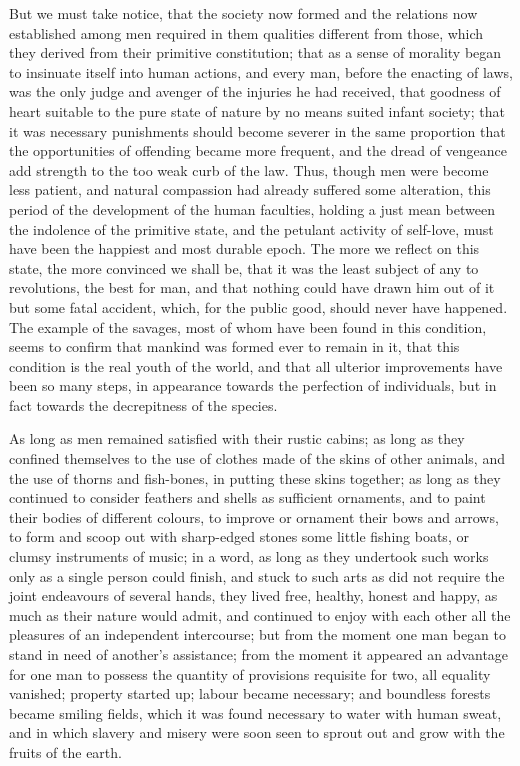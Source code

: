\documentclass[11pt,twocolumn]{ltugboat}
\begin{document}
But we must take notice, that the society now formed and the relations
now established among men required in them qualities different from
those, which they derived from their primitive constitution; that as a
sense of morality began to insinuate itself into human actions, and
every man, before the enacting of laws, was the only judge and avenger
of the injuries he had received, that goodness of heart suitable to
the pure state of nature by no means suited infant society; that it
was necessary punishments should become severer in the same proportion
that the opportunities of offending became more frequent, and the
dread of vengeance add strength to the too weak curb of the law. Thus,
though men were become less patient, and natural compassion had
already suffered some alteration, this period of the development of
the human faculties, holding a just mean between the indolence of the
primitive state, and the petulant activity of self-love, must have
been the happiest and most durable epoch. The more we reflect on this
state, the more convinced we shall be, that it was the least subject
of any to revolutions, the best for man, and that nothing could have
drawn him out of it but some fatal accident, which, for the public
good, should never have happened. The example of the savages, most of
whom have been found in this condition, seems to confirm that mankind
was formed ever to remain in it, that this condition is the real youth
of the world, and that all ulterior improvements have been so many
steps, in appearance towards the perfection of individuals, but in
fact towards the decrepitness of the species.

As long as men remained satisfied with their rustic cabins; as long as
they confined themselves to the use of clothes made of the skins of
other animals, and the use of thorns and fish-bones, in putting these
skins together; as long as they continued to consider feathers and
shells as sufficient ornaments, and to paint their bodies of different
colours, to improve or ornament their bows and arrows, to form and
scoop out with sharp-edged stones some little fishing boats, or clumsy
instruments of music; in a word, as long as they undertook such works
only as a single person could finish, and stuck to such arts as did
not require the joint endeavours of several hands, they lived free,
healthy, honest and happy, as much as their nature would admit, and
continued to enjoy with each other all the pleasures of an independent
intercourse; but from the moment one man began to stand in need of
another's assistance; from the moment it appeared an advantage for one
man to possess the quantity of provisions requisite for two, all
equality vanished; property started up; labour became necessary; and
boundless forests became smiling fields, which it was found necessary
to water with human sweat, and in which slavery and misery were soon
seen to sprout out and grow with the fruits of the earth.
\end{document}
